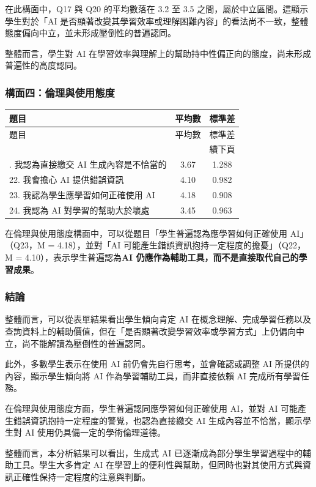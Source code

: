 在此構面中，Q17 與 Q20 的平均數落在 3.2 至 3.5 之間，屬於中立區間。這顯示學生對於「AI 是否顯著改變其學習效率或理解困難內容」的看法尚不一致，整體態度偏向中立，並未形成壓倒性的普遍認同。

整體而言，學生對 AI 在學習效率與理解上的幫助持中性偏正向的態度，尚未形成普遍性的高度認同。

\subsubsection{構面四：倫理與使用態度}\label{sec:構面四}

\begin{longtable}{l c c}
\toprule
題目 & 平均數 & 標準差 \\
\midrule
\endfirsthead
\toprule
題目 & 平均數 & 標準差 \\
\midrule
\endhead
\midrule
\multicolumn{3}{r}{續下頁} \\
\endfoot
\bottomrule
\endlastfoot
21. 我認為直接繳交 AI 生成內容是不恰當的 & 3.67 & 1.288 \\
22. 我會擔心 AI 提供錯誤資訊 & 4.10 & 0.982 \\
23. 我認為學生應學習如何正確使用 AI & 4.18 & 0.908 \\
24. 我認為 AI 對學習的幫助大於壞處 & 3.45 & 0.963 \\
\end{longtable}

在倫理與使用態度構面中，可以從題目「學生普遍認為應學習如何正確使用 AI」（Q23，M = 4.18），並對「AI 可能產生錯誤資訊抱持一定程度的擔憂」（Q22，M = 4.10），表示學生普遍認為\textbf{AI 仍應作為輔助工具，而不是直接取代自己的學習成果}。

\subsubsection{結論}

整體而言，可以從表單結果看出學生傾向肯定 AI 在概念理解、完成學習任務以及查詢資料上的輔助價值，但在「是否顯著改變學習效率或學習方式」上仍偏向中立，尚不能解讀為壓倒性的普遍認同。

此外，多數學生表示在使用 AI 前仍會先自行思考，並會確認或調整 AI 所提供的內容，顯示學生傾向將 AI 作為學習輔助工具，而非直接依賴 AI 完成所有學習任務。

在倫理與使用態度方面，學生普遍認同應學習如何正確使用 AI，並對 AI 可能產生錯誤資訊抱持一定程度的警覺，也認為直接繳交 AI 生成內容並不恰當，顯示學生對 AI 使用仍具備一定的學術倫理道德。

整體而言，本分析結果可以看出，生成式 AI 已逐漸成為部分學生學習過程中的輔助工具。學生大多肯定 AI 在學習上的便利性與幫助，但同時也對其使用方式與資訊正確性保持一定程度的注意與判斷。
